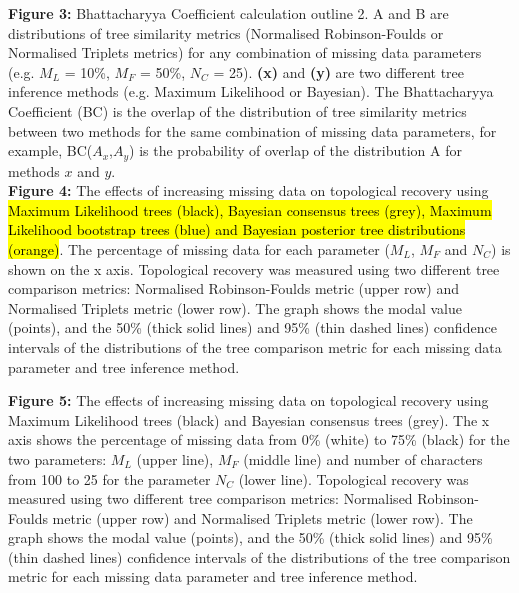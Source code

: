 \documentclass[12pt,letterpaper]{article}
\begin{document}
\noindent
\textbf{Figure 3:} Bhattacharyya Coefficient calculation outline 2. A and B are distributions of tree similarity metrics (Normalised Robinson-Foulds or Normalised Triplets metrics) for any combination of missing data parameters (e.g. $M_{L}$ = 10\%, $M_{F}$ = 50\%, $N_{C}$ = 25). \textbf{(x)} and \textbf{(y)} are two different tree inference methods (e.g. Maximum Likelihood or Bayesian). The Bhattacharyya Coefficient (BC) is the overlap of the distribution of tree similarity metrics between two methods for the same combination of missing data parameters, for example, BC($A_{x}$,$A_{y}$) is the probability of overlap of the distribution A for methods $x$ and $y$.\\

\bigskip
\noindent
\textbf{Figure 4:} The effects of increasing missing data on topological recovery using \hl{Maximum Likelihood trees (black), Bayesian consensus trees (grey), Maximum Likelihood bootstrap trees (blue) and Bayesian posterior tree distributions (orange)}. The percentage of missing data for each parameter ($M_{L}$, $M_{F}$ and $N_{C}$) is shown on the x axis. Topological recovery was measured using two different tree comparison metrics: Normalised Robinson-Foulds metric (upper row) and Normalised Triplets metric (lower row). The graph shows the modal value (points), and the 50\% (thick solid lines) and 95\% (thin dashed lines) confidence intervals of the distributions of the tree comparison metric for each missing data parameter and tree inference method.


\bigskip
\noindent
\textbf{Figure 5:} The effects of increasing missing data on topological recovery using Maximum Likelihood trees (black) and Bayesian consensus trees (grey). The x axis shows the percentage of missing data from 0\% (white) to 75\% (black) for the two parameters: $M_{L}$ (upper line), $M_{F}$ (middle line) and number of characters from 100 to 25 for the parameter $N_{C}$ (lower line). Topological recovery was measured using two different tree comparison metrics: Normalised Robinson-Foulds metric (upper row) and Normalised Triplets metric (lower row). The graph shows the modal value (points), and the 50\% (thick solid lines) and 95\% (thin dashed lines) confidence intervals of the distributions of the tree comparison metric for each missing data parameter and tree inference method.
\end{document}
